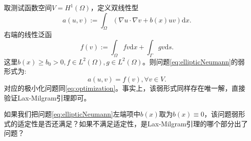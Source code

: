 \documentclass[lang=cn,10pt,newtx]{elegantbook}
\newcommand{\dif}{\mathrm{d}}
\begin{document}
取测试函数空间$V=H^{1}(\Omega)$，定义双线性型
\begin{equation}
  a(u,v):=\int_{\Omega}(\nabla u\cdot\nabla v+b(x)uv)\dif x.
\end{equation}
右端的线性泛函
\begin{equation}
  f(v):=\int_{\Omega}fv\dif x+\int_{\Gamma}gv\dif s.
\end{equation}
这里$b(x)\ge b_{0}>0,f\in L^{2}(\Omega),g\in L^{2}(\Omega)$。则问题\eqref{eq:ellipticNeumann}的弱形式为:
\begin{equation}
  a(u,v)=f(v),\forall v\in V.
\end{equation}
对应的极小化问题同\eqref{eq:optimization}。事实上，该弱形式同样存在唯一解，直接验证Lax-Milgram引理即可。
\begin{exercise}
  如果我们把问题\eqref{eq:ellipticNeumann}左端项中$b(x)$取为$b(x)\equiv 0$，该问题弱形式的适定性是否还满足？如果不满足适定性，是Lax-Milgram引理的哪个部分出了问题？
\end{exercise}
\end{document}
